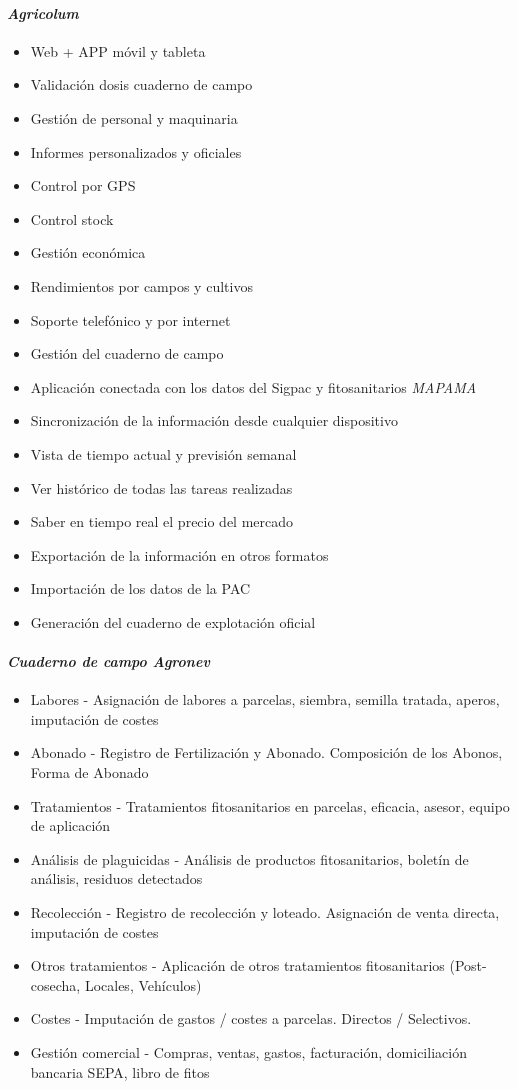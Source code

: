 \paragraph*{\textit{Agricolum}} \cite{agricolum}
\begin{itemize}
\item Web + APP móvil y tableta
\item Validación dosis cuaderno de campo
\item Gestión de personal y maquinaria
\item Informes personalizados y oficiales
\item Control por GPS
\item Control stock
\item Gestión económica
\item Rendimientos por campos y cultivos
\item Soporte telefónico y por internet
\item Gestión del cuaderno de campo
\item Aplicación conectada con los datos del Sigpac y fitosanitarios \textit{MAPAMA}
\item Sincronización de la información desde cualquier dispositivo
\item Vista de tiempo actual y previsión semanal
\item Ver histórico de todas las tareas realizadas
\item Saber en tiempo real el precio del mercado
\item Exportación de la información en otros formatos
\item Importación de los datos de la PAC
\item Generación del cuaderno de explotación oficial
\end{itemize}
\paragraph*{\textit{Cuaderno de campo Agronev}} \cite{agronev}
\begin{itemize}
\item Labores - Asignación de labores a parcelas, siembra, semilla tratada, aperos, imputación de costes
\item Abonado - Registro de Fertilización y Abonado. Composición de los Abonos, Forma de Abonado
\item Tratamientos - Tratamientos fitosanitarios en parcelas, eficacia, asesor, equipo de aplicación
\item Análisis de plaguicidas - Análisis de productos fitosanitarios, boletín de análisis, residuos detectados
\item Recolección - Registro de recolección y loteado. Asignación de venta directa, imputación de costes
\item Otros tratamientos - Aplicación de otros tratamientos fitosanitarios (Post-cosecha, Locales, Vehículos)
\item Costes - Imputación de gastos / costes a parcelas. Directos / Selectivos.
\item Gestión comercial - Compras, ventas, gastos, facturación, domiciliación bancaria SEPA, libro de fitos 
\end{itemize}


